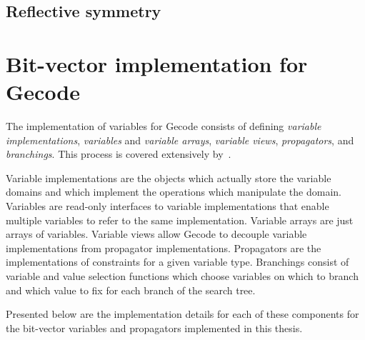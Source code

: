 \documentclass[a4paper,10pt,twoside,openright]{book}
\begin{document}
\section{Reflective symmetry}
\label{sec:symmetryreflection}


\chapter{Bit-vector implementation for Gecode}
\label{sec:implementation}

The implementation of variables for Gecode 
consists of defining \textit{variable implementations}, \textit{variables} and \textit{variable arrays}, \textit{variable views}, \textit{propagators}, and \textit{branchings}. This process is covered extensively by~\cite{MPG:V}. 

Variable implementations are the objects which actually store the variable domains and which implement the operations which manipulate the domain.
Variables are read-only interfaces to variable implementations that enable multiple variables to refer to the same implementation.
Variable arrays are just arrays of variables. 
Variable views allow Gecode to decouple variable implementations from propagator implementations.
Propagators are the implementations of constraints for a given variable type.
Branchings consist of variable and value selection functions which 
choose variables on which to branch 
and which value to fix for each branch of the search tree.

Presented below are the implementation details for each of these components for the bit-vector variables and propagators implemented in this thesis. 
\end{document}
